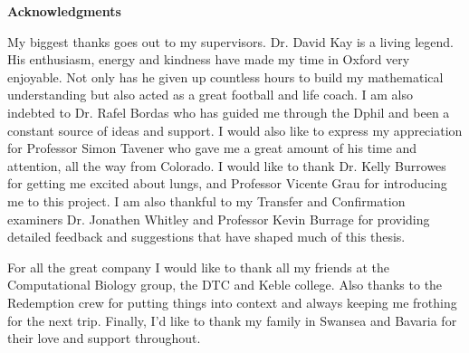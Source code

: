 \begin{center}
\textbf{\large Acknowledgments}
\end{center}
My biggest thanks goes out to my supervisors. Dr. David Kay is a living legend. His enthusiasm, energy and kindness have made my time in Oxford very enjoyable. Not only has he given up countless hours to build my mathematical understanding but also acted as a great football and life coach. I am also indebted to Dr. Rafel Bordas who has guided me through the Dphil and been a constant source of ideas and support. I would also like to express my appreciation for Professor Simon Tavener who gave me a great amount of his time and attention, all the way from Colorado. I would like to thank Dr. Kelly Burrowes for getting me excited about lungs, and Professor Vicente Grau for introducing me to this project. I am also thankful to my Transfer and Confirmation examiners Dr. Jonathen Whitley and Professor Kevin Burrage for providing detailed feedback and suggestions that have shaped much of this thesis. 

For all the great company I would like to thank all my friends at the Computational Biology group, the DTC and Keble college. Also thanks to the Redemption crew for putting things into context and always keeping me frothing for the next trip. Finally, I'd like to thank my family in Swansea and Bavaria for their love and support throughout.



\clearpage

